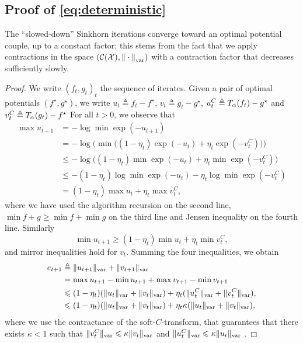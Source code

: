 \subsection{Proof of \autoref{eq:deterministic}}

The \enquote{slowed-down} Sinkhorn iterations converge toward an optimal
potential couple, up to a constant factor: this stems from the fact that we
apply contractions in the space $(\mathcal{C}(\mathcal{X}), {\Vert\cdot\Vert}_{\text{\upshape var}})$ with a
contraction factor that decreases sufficiently slowly.

\begin{proof}
    We write ${(f_t, g_t)}_t$ the sequence of iterates. Given a pair of optimal potentials 
    $(f^\star, g^\star)$, we write $u_t \triangleq f_t - f^\star$, $v_t \triangleq g_t - g^\star$,
    $u_t^C \triangleq T_{\alpha}(f_t) - g^\star$ and $v_t^C \triangleq T_{\alpha}(g_t) - f^\star$
    For all $t > 0$, we observe that 
    \begin{align}
        \max u_{t+1} &= - \log \min \exp(-u_{t+1}) \\
        &= - \log \big( \min \big( (1 - \eta_t) \exp(-u_{t}) + \eta_t 
        \exp(-v_t^C) \big) \big)\\
        &\leq - \log \big( (1 - \eta_t) \min \exp(-u_{t}) + \eta_t 
        \min \exp(-v_t^C) \big)\\
        &\leq - (1 - \eta_t) \log \min \exp(-u_{t}) -  \eta_t \log \min
         \exp(-v_t^C) \\
         &= (1 - \eta_t) \max u_t  + \eta_t \max v_t^C,
    \end{align}
    where we have used the algorithm recursion on the second line, $\min f + g \geq \min f + \min g$
     on the third line and Jensen inequality on the fourth line. Similarly
    \begin{equation}
        \min u_{t+1} \geq (1 - \eta_t) \min u_t  + \eta_t \min v_t^C,
    \end{equation}
    and mirror inequalities hold for $v_t$. Summing the four inequalities, we obtain
    \begin{align}\label{eq:et}
        e_{t+1} &\triangleq \Vert u_{t+1} \Vert_{\text{\upshape var}} + \Vert v_{t+1} \Vert_{\text{\upshape var}} \\ 
        &= \max u_{t+1} - \min u_{t+1} + \max v_{t+1} - \min v_{t+1} \\
        &\leqslant
        (1 - \eta_t) ( \Vert u_t \Vert_{\text{\upshape var}} + \Vert v_t \Vert_{\text{\upshape var}})
        + \eta_t ( \Vert u_t^C \Vert_{\text{\upshape var}} + \Vert v_t^C \Vert_{\text{\upshape var}}), \\
        &\leqslant
        (1 - \eta_t) ( \Vert u_t \Vert_{\text{\upshape var}} + \Vert v_t \Vert_{\text{\upshape var}})
        + \eta_t \kappa ( \Vert u_t \Vert_{\text{\upshape var}} + \Vert v_t \Vert_{\text{\upshape var}}),
    \end{align}
    where we use the contractance of the soft-$C$-transform, that guarantees that
    there exists $\kappa < 1$ such that $\Vert v_t^C\Vert_{\text{\upshape var}} \leqslant \kappa \Vert
    v_t\Vert_{\text{\upshape var}}$ and $\Vert u_t^C\Vert_{\text{\upshape var}} \leqslant \kappa \Vert
    u_t\Vert_{\text{\upshape var}}$ \citep{peyre2019computational}.


\end{proof}
